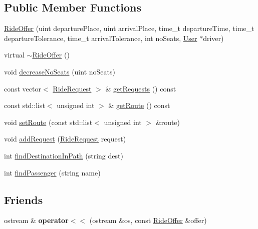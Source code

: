 \subsection*{Public Member Functions}
\begin{DoxyCompactItemize}
\item 
\hyperlink{class_ride_offer_ade002d578a8ee317d34c88d5b4b5e2d7}{Ride\+Offer} (uint departure\+Place, uint arrival\+Place, time\+\_\+t departure\+Time, time\+\_\+t departure\+Tolerance, time\+\_\+t arrival\+Tolerance, int no\+Seats, \hyperlink{class_user}{User} $\ast$driver)
\item 
virtual \hyperlink{class_ride_offer_a2d6af9fd7260933d7f082d046c9738d9}{$\sim$\+Ride\+Offer} ()
\item 
void \hyperlink{class_ride_offer_a145cf12bbda55809eb41740cbd45a6f5}{decrease\+No\+Seats} (uint no\+Seats)
\item 
const vector$<$ \hyperlink{class_ride_request}{Ride\+Request} $>$ \& \hyperlink{class_ride_offer_a62e995e6e3cc7aaa074d2a9f69329212}{get\+Requests} () const 
\item 
const std\+::list$<$ unsigned int $>$ \& \hyperlink{class_ride_offer_aa03bcf9a56b427b96ca09f55e26c5e9c}{get\+Route} () const 
\item 
void \hyperlink{class_ride_offer_a173345d8bc9af6b0d951f8202aab0fef}{set\+Route} (const std\+::list$<$ unsigned int $>$ \&route)
\item 
void \hyperlink{class_ride_offer_a0dc50af57fdea2e2869e4414e7bb124c}{add\+Request} (\hyperlink{class_ride_request}{Ride\+Request} request)
\item 
int \hyperlink{class_ride_offer_a5f0b73a8e3d8eeb7ada457108ad8e283}{find\+Destination\+In\+Path} (string dest)
\item 
int \hyperlink{class_ride_offer_a719a39a85051411efee4eff5878a94a2}{find\+Passenger} (string name)
\end{DoxyCompactItemize}
\subsection*{Friends}
\begin{DoxyCompactItemize}
\item 
ostream \& {\bfseries operator$<$$<$} (ostream \&os, const \hyperlink{class_ride_offer}{Ride\+Offer} \&offer)\hypertarget{class_ride_offer_a45d312450d0340c9527df5c0503bd9f3}{}\label{class_ride_offer_a45d312450d0340c9527df5c0503bd9f3}

\end{DoxyCompactItemize}
